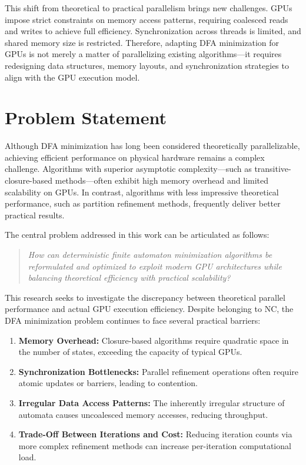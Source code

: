 This shift from theoretical to practical parallelism brings new challenges. GPUs impose strict constraints on memory access patterns, requiring coalesced reads and writes to achieve full efficiency. Synchronization across threads is limited, and shared memory size is restricted. Therefore, adapting DFA minimization for GPUs is not merely a matter of parallelizing existing algorithms—it requires redesigning data structures, memory layouts, and synchronization strategies to align with the GPU execution model.

\section{Problem Statement}

Although DFA minimization has long been considered theoretically parallelizable, achieving efficient performance on physical hardware remains a complex challenge. Algorithms with superior asymptotic complexity—such as transitive-closure-based methods—often exhibit high memory overhead and limited scalability on GPUs. In contrast, algorithms with less impressive theoretical performance, such as partition refinement methods, frequently deliver better practical results.

The central problem addressed in this work can be articulated as follows:
\begin{quote}
\textit{How can deterministic finite automaton minimization algorithms be reformulated and optimized to exploit modern GPU architectures while balancing theoretical efficiency with practical scalability?}
\end{quote}

This research seeks to investigate the discrepancy between theoretical parallel performance and actual GPU execution efficiency. Despite belonging to NC, the DFA minimization problem continues to face several practical barriers:
\begin{enumerate}
    \item \textbf{Memory Overhead:} Closure-based algorithms require quadratic space in the number of states, exceeding the capacity of typical GPUs.
    \item \textbf{Synchronization Bottlenecks:} Parallel refinement operations often require atomic updates or barriers, leading to contention.
    \item \textbf{Irregular Data Access Patterns:} The inherently irregular structure of automata causes uncoalesced memory accesses, reducing throughput.
    \item \textbf{Trade-Off Between Iterations and Cost:} Reducing iteration counts via more complex refinement methods can increase per-iteration computational load.
\end{enumerate}

